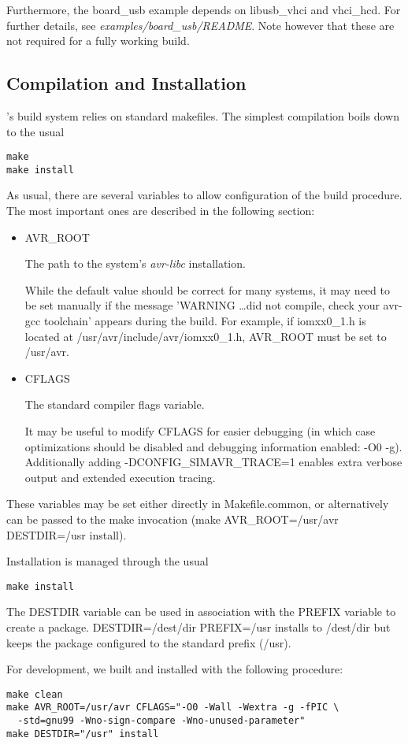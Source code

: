 Furthermore, the board\_usb example depends on libusb\_vhci and vhci\_hcd. For
further details, see \emph{examples/board\_usb/README}. Note however that these
are not required for a fully working \simavr build.

\subsection{Compilation and Installation}

\simavr's build system relies on standard makefiles. The simplest compilation
boils down to the usual

\begin{verbatim}
make
make install
\end{verbatim}

As usual, there are several variables to allow configuration of the build
procedure. The most important ones are described in the following section:

\begin{itemize}
\item AVR\_ROOT

The path to the system's \emph{avr-libc} installation.

While the default value
should be correct for many systems, it may need to be set manually if the
message 'WARNING \ldots did not compile, check your avr-gcc
toolchain' appears during the build. For example, if iomxx0\_1.h is located at
/usr/avr/include/avr/iomxx0\_1.h, AVR\_ROOT must be set to /usr/avr.

\item CFLAGS

The standard compiler flags variable.

It may be useful to modify CFLAGS for easier debugging (in which case
optimizations should be disabled and debugging information enabled: -O0 -g).
Additionally adding -DCONFIG\_SIMAVR\_TRACE=1 enables extra verbose output and
extended execution tracing.
\end{itemize}

These variables may be set either directly in Makefile.common, or alternatively
can be passed to the make invocation (make AVR\_ROOT=/usr/avr DESTDIR=/usr
install).

Installation is managed through the usual
\begin{verbatim}
make install
\end{verbatim}

The DESTDIR variable can be used in association with the PREFIX variable to create a \simavr package. DESTDIR=/dest/dir
PREFIX=/usr installs to /dest/dir but keeps the package configured to the standard prefix
(/usr).

For development, we built and installed \simavr with the following procedure:

\begin{verbatim}
make clean
make AVR_ROOT=/usr/avr CFLAGS="-O0 -Wall -Wextra -g -fPIC \
  -std=gnu99 -Wno-sign-compare -Wno-unused-parameter"
make DESTDIR="/usr" install
\end{verbatim}
